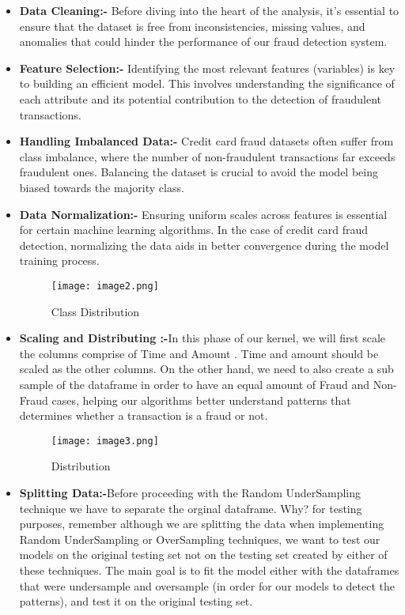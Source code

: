 \begin{itemize}
    \item \textbf{Data Cleaning:-} Before diving into the heart of the analysis, it's essential to ensure that the dataset is free from inconsistencies, missing values, and anomalies that could hinder the performance of our fraud detection system.

    \item \textbf{Feature Selection:-} Identifying the most relevant features (variables) is key to building an efficient model. This involves understanding the significance of each attribute and its potential contribution to the detection of fraudulent transactions.

    \item \textbf{Handling Imbalanced Data:-} Credit card fraud datasets often suffer from class imbalance, where the number of non-fraudulent transactions far exceeds fraudulent ones. Balancing the dataset is crucial to avoid the model being biased towards the majority class.

    \item \textbf{ Data Normalization:-}  Ensuring uniform scales across features is essential for certain machine learning algorithms. In the case of credit card fraud detection, normalizing the data aids in better convergence during the model training process.
    
\begin{figure}[h]
    \centering
    \texttt{[image: image2.png]}
    \caption{Class Distribution}
    \label{fig:enter-label}
\end{figure}

\item \textbf{ Scaling and Distributing :-}In this phase of our kernel, we will first scale the columns comprise of Time and Amount . Time and amount should be scaled as the other columns. On the other hand, we need to also create a sub sample of the dataframe in order to have an equal amount of Fraud and Non-Fraud cases, helping our algorithms better understand patterns that determines whether a transaction is a fraud or not.

 \begin{figure}[h]
    \centering
    \texttt{[image: image3.png]}
    \caption{Distribution}
    \label{fig:enter-label}
 \end{figure}

\item \textbf{ Splitting Data:-}Before proceeding with the Random UnderSampling technique we have to separate the orginal dataframe. Why? for testing purposes, remember although we are splitting the data when implementing Random UnderSampling or OverSampling techniques, we want to test our models on the original testing set not on the testing set created by either of these techniques. The main goal is to fit the model either with the dataframes that were undersample and oversample (in order for our models to detect the patterns), and test it on the original testing set.

\end{itemize}

